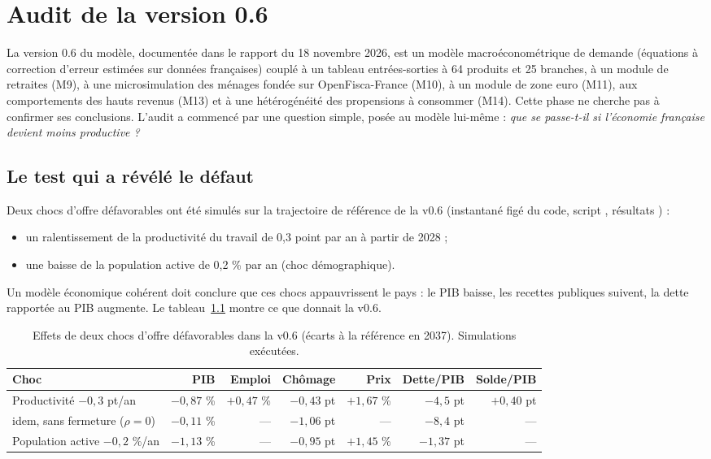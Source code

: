 \chapter{Audit de la version 0.6}\label{ch:audit}

La version 0.6 du modèle, documentée dans le rapport du 18 novembre 2026, est un modèle macroéconométrique de demande
(équations à correction d'erreur estimées sur données françaises) couplé à un tableau entrées-sorties à 64 produits et
25 branches, à un module de retraites (M9), à une microsimulation des ménages fondée sur OpenFisca-France (M10), à un
module de zone euro (M11), aux comportements des hauts revenus (M13) et à une hétérogénéité des propensions à
consommer (M14). Cette phase ne cherche pas à confirmer ses conclusions. L'audit a commencé par une question simple,
posée au modèle lui-même : \emph{que se passe-t-il si l'économie française devient moins productive ?}

\section{Le test qui a révélé le défaut}

Deux chocs d'offre défavorables ont été simulés sur la trajectoire de référence de la v0.6 (instantané figé du code,
script , résultats ) :
\begin{itemize}
\item un ralentissement de la productivité du travail de 0,3 point par an à partir de 2028 ;
\item une baisse de la population active de 0,2 \% par an (choc démographique).
\end{itemize}
Un modèle économique cohérent doit conclure que ces chocs appauvrissent le pays : le PIB baisse, les recettes
publiques suivent, la dette rapportée au PIB augmente. Le tableau~\ref{tab:audit} montre ce que donnait la v0.6.

\begin{table}[h]\centering\small
\caption{Effets de deux chocs d'offre défavorables dans la v0.6 (écarts à la référence en 2037). Simulations exécutées.}\label{tab:audit}
\begin{tabular}{lrrrrrr}\toprule
Choc & PIB & Emploi & Chômage & Prix & Dette/PIB & Solde/PIB\\ \midrule
Productivité $-0{,}3$ pt/an & $-0{,}87$ \% & $+0{,}47$ \% & $-0{,}43$ pt & $+1{,}67$ \% & $-4{,}5$ pt & $+0{,}40$ pt\\
\quad idem, sans fermeture ($\rho=0$) & $-0{,}11$ \% & --- & $-1{,}06$ pt & --- & $-8{,}4$ pt & ---\\
Population active $-0{,}2$ \%/an & $-1{,}13$ \% & --- & $-0{,}95$ pt & $+1{,}45$ \% & $-1{,}37$ pt & ---\\ \bottomrule
\end{tabular}
\end{table}

